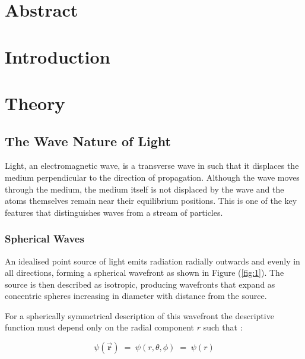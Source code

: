 \documentclass[12pt]{article}
\begin{document}
\section*{Abstract}
\thispagestyle{empty}


\newpage


\setcounter{page}{1}
\section{Introduction} \label{sec:1}


\section{Theory} \label{sec:2}

\subsection{The Wave Nature of Light}

Light, an electromagnetic wave, is a transverse wave in such that it displaces the medium perpendicular to the direction of propagation.
Although the wave moves through the medium, the medium itself is not displaced by the wave and the atoms themselves remain near their equilibrium positions.
This is one of the key features that distinguishes waves from a stream of particles.
\cite{hecht2012optics}

\subsubsection{Spherical Waves}

An idealised point source of light emits radiation radially outwards and evenly in all directions, forming a spherical wavefront as shown in Figure (\ref{fig:1}).
The source is then described as isotropic, producing wavefronts that expand as concentric spheres increasing in diameter with distance from the source.
\cite{hecht2012optics}

For a spherically symmetrical description of this wavefront the descriptive function must depend only on the radial component \( r \) such that \cite{hecht2012optics,Born_Wolf_Bhatia_Clemmow_Gabor_Stokes_Taylor_Wayman_Wilcock_1999}:

\begin{equation} \label{eq:1}
    \psi(\vec{\mathbf{r}}) \; = \; \psi(r,\theta,\phi) \; =\; \psi(r)
\end{equation}
\end{document}
